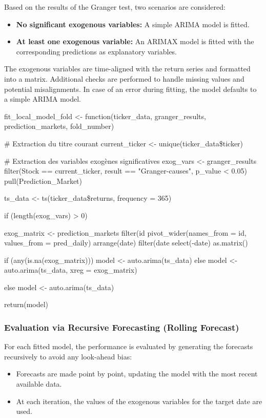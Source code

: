 \documentclass[12pt]{report}
\begin{document}
Based on the results of the Granger test, two scenarios are considered:
\begin{itemize}
    \item \textbf{No significant exogenous variables:} A simple ARIMA model is fitted.
    \item \textbf{At least one exogenous variable:} An ARIMAX model is fitted with the corresponding predictions as explanatory variables.
\end{itemize}

The exogenous variables are time-aligned with the return series and formatted into a matrix. Additional checks are performed to handle missing values and potential misalignments. In case of an error during fitting, the model defaults to a simple ARIMA model.\\

\begin{code}[caption={Modélisation locale ARIMA/ARIMAX pour chaque action}]
fit_local_model_fold <- function(ticker_data, granger_results, prediction_markets, fold_number) {
  # Extraction du titre courant
  current_ticker <- unique(ticker_data\$ticker)
  
  # Extraction des variables exogènes significatives
  exog_vars <- granger_results %
    filter(Stock == current_ticker, result == "Granger-causes", p_value < 0.05) %
    pull(Prediction_Market)

  ts_data <- ts(ticker_data\$returns, frequency = 365)

  if (length(exog_vars) > 0) {
    exog_matrix <- prediction_markets %
      filter(id %
      pivot_wider(names_from = id, values_from = pred_daily) %
      arrange(date) %
      filter(date %
      select(-date) %
      as.matrix()

    if (any(is.na(exog_matrix))) {
      model <- auto.arima(ts_data)
    } else {
      model <- auto.arima(ts_data, xreg = exog_matrix)
    }
  } else {
    model <- auto.arima(ts_data)
  }

  return(model)
}
\end{code}

\subsubsection{Evaluation via Recursive Forecasting (Rolling Forecast)}

For each fitted model, the performance is evaluated by generating the forecasts recursively to avoid any look-ahead bias:
\begin{itemize}
    \item Forecasts are made point by point, updating the model with the most recent available data.
    \item At each iteration, the values of the exogenous variables for the target date are used.
\end{itemize}
\end{document}
